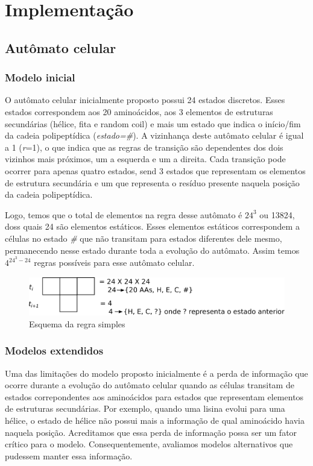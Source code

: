 \chapter{Implementação}

\section{Autômato celular}

\subsection{Modelo inicial}

O autômato celular inicialmente proposto possui 24 estados discretos. Esses estados correspondem aos 20 aminoácidos, aos 3 elementos de estruturas secundárias (hélice, fita e random coil) e mais um estado que indica o início/fim da cadeia polipeptídica (\textit{estado=\#}). A vizinhança deste autômato celular é igual a 1 (\textit{r}=1),  o que indica que as regras de transição são dependentes dos dois vizinhos mais próximos, um a esquerda e um a direita. Cada transição pode ocorrer para apenas quatro estados, send 3 estados que representam os elementos de estrutura secundária e um que representa o resíduo presente naquela posição da cadeia polipeptídica.

Logo, temos que o total de elementos na regra desse autômato é $24^3$ ou 13824, doss quais 24 são elementos estáticos. Esses elementos estáticos correspondem a células no estado \textit{\#}  que não transitam para estados diferentes dele mesmo, permanecendo nesse estado durante toda a evolução do autômato. Assim temos $4^{24^3-24}$ regras possíveis para esse autômato celular.

\begin{figure}
  \centering
  \includegraphics[width=.8\textwidth]{figures/ca_rule_scheme.pdf}
  \caption{Esquema da regra simples}
        \label{fig:ca_rule_scheme}
\end{figure}

\subsection{Modelos extendidos}

Uma das limitações do modelo proposto inicialmente é a perda de informação que ocorre durante a evolução do autômato celular quando as células transitam de estados correpondentes aos aminoácidos para estados que representam elementos de estruturas secundárias. Por exemplo, quando uma lisina evolui para uma hélice, o estado de hélice não possui mais a informação de qual aminoácido havia naquela posição. Acreditamos que essa perda de informação possa ser um fator crítico para o modelo. Consequentemente, avaliamos modelos alternativos que pudessem manter essa informação. 

